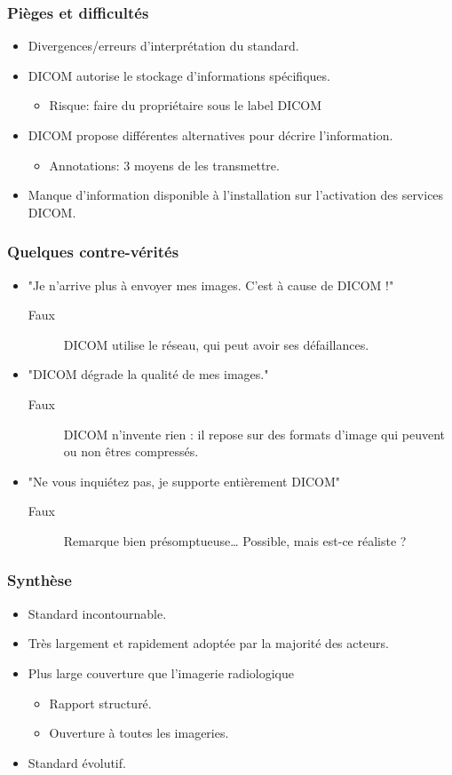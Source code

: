 \frame
{
	\frametitle{Pi\`eges et difficult\'es}
	\begin{itemize}
		\item Divergences/erreurs d'interpr\'etation du standard.
		\item DICOM autorise le stockage d'informations sp\'ecifiques.
		\begin{itemize}
			\item Risque: faire du propri\'etaire sous le label DICOM
		\end{itemize}
		\item DICOM propose diff\'erentes alternatives pour d\'ecrire l'information.
		\begin{itemize}
			\item Annotations: 3 moyens de les transmettre.
		\end{itemize}
		\item Manque d'information disponible \`a l'installation sur l'activation des services DICOM.
	\end{itemize}
}

\frame
{
	\frametitle{Quelques contre-v\'erit\'es}
	\begin{itemize}
		\item "Je n'arrive plus \`a envoyer mes images. C'est \`a cause de DICOM !"
		\begin{description}
			\item[Faux] DICOM utilise le r\'eseau, qui peut avoir ses d\'efaillances.
		\end{description}
		\item "DICOM d\'egrade la qualit\'e de mes images."
		\begin{description}
			\item[Faux] DICOM n'invente rien : il repose sur des formats d'image qui peuvent ou non \^etres compress\'es.
		\end{description}
		\item "Ne vous inqui\'etez pas, je supporte enti\`erement DICOM"
		\begin{description}
			\item[Faux] Remarque bien pr\'esomptueuse\ldots
			Possible, mais est-ce r\'ealiste ?
		\end{description}
	\end{itemize}
}

\frame
{
	\frametitle{Synth\`ese}
	\begin{itemize}
		\item Standard incontournable.
		\item Tr\`es largement et rapidement adopt\'ee par la majorit\'e des acteurs.
		\item Plus large couverture que l'imagerie radiologique
		\begin{itemize}
			\item Rapport structur\'e.
			\item Ouverture \`a toutes les imageries.
		\end{itemize}
		\item Standard \'evolutif.
	\end{itemize}
}
